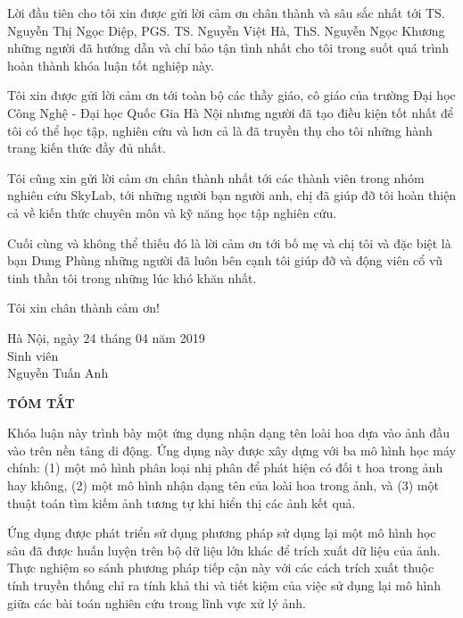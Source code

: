 \documentclass[12pt]{report}
\begin{document}
		Lời đầu tiên cho tôi xin được gửi lời cảm ơn chân thành và sâu sắc nhất tới TS. Nguyễn Thị Ngọc Diệp, PGS. TS. Nguyễn Việt Hà, ThS. Nguyễn Ngọc Khương những người đã hướng dẫn và chỉ bảo tận tình nhất cho tôi trong suốt quá trình hoàn thành khóa luận tốt nghiệp này.
																								
		Tôi xin được gửi lời cảm ơn tới toàn bộ các thầy giáo, cô giáo của trường Đại học Công Nghệ - Đại học Quốc Gia Hà Nội nhưng người đã tạo điều kiện tốt nhất để tôi có thể học tập, nghiên cứu và hơn cả là đã truyền thụ cho tôi những hành trang kiến thức đầy đủ nhất.
																								
		Tôi cũng xin gửi lời cảm ơn chân thành nhất tới các thành viên trong nhóm nghiên cứu SkyLab, tới những người bạn người anh, chị đã giúp đỡ tôi hoàn thiện cả về kiến thức chuyên môn và kỹ năng học tập nghiên cứu.
																								
		Cuối cùng và không thể thiếu đó là lời cảm ơn tới bố mẹ và chị tôi và đặc biệt là bạn Dung Phùng những người đã luôn bên cạnh tôi giúp đỡ và động viên cổ vũ tinh thần tôi trong những lúc khó khăn nhất.
																								
		Tôi xin chân thành cảm ơn!
																								
		\begin{flushright}
			\begin{varwidth}{\linewidth}\centering
				Hà Nội, ngày 24 tháng 04 năm 2019\\
				Sinh viên\\[2cm]
				Nguyễn Tuấn Anh
			\end{varwidth}
		\end{flushright}
																									
		\newpage
		\begin{center}
			\textbf{\large TÓM TẮT}
		\end{center}
																								
		Khóa luận này trình bày một ứng dụng nhận dạng tên loài hoa dựa vào ảnh đầu vào trên nền tảng di động. Ứng dụng này được xây dựng với ba mô hình học máy chính: (1) một mô hình phân loại nhị phân để phát hiện có đối t hoa trong ảnh hay không, (2) một mô hình nhận dạng tên của loài hoa trong ảnh, và (3) một thuật toán tìm kiếm ảnh tương tự khi hiển thị các ảnh kết quả. 
																								
		Ứng dụng được phát triển sử dụng phương pháp sử dụng lại một mô hình học sâu đã được huấn luyện trên bộ dữ liệu lớn khác để trích xuất dữ liệu của ảnh. Thực nghiệm so sánh phương pháp tiếp cận này với các cách trích xuất thuộc tính truyền thống chỉ ra tính khả thi và tiết kiệm của việc sử dụng lại mô hình giữa các bài toán nghiên cứu trong lĩnh vực xử lý ảnh.
																								
\end{document}
